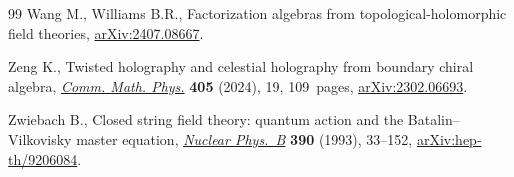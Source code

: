 \documentclass[pdftex]{sigma}
\numberwithin{equation}{section}
\theoremstyle{definition}
\begin{document}
\begin{thebibliography}{99}
Wang M., Williams B.R., Factorization algebras from topological-holomorphic
 field theories, \href{http://arxiv.org/abs/2407.08667}{arXiv:2407.08667}.

Zeng K., Twisted holography and celestial holography from boundary chiral
 algebra, \href{https://doi.org/10.1007/s00220-023-04917-0}{\textit{Comm.
 Math. Phys.}} \textbf{405} (2024), 19, 109~pages,
 \href{http://arxiv.org/abs/2302.06693}{arXiv:2302.06693}.

Zwiebach B., Closed string field theory: quantum action and the
 {B}atalin--{V}ilkovisky master equation,
 \href{https://doi.org/10.1016/0550-3213(93)90388-6}{\textit{Nuclear Phys.~B}}
 \textbf{390} (1993), 33--152,
 \href{http://arxiv.org/abs/hep-th/9206084}{arXiv:hep-th/9206084}.

\end{thebibliography}\LastPageEnding
\end{document}
